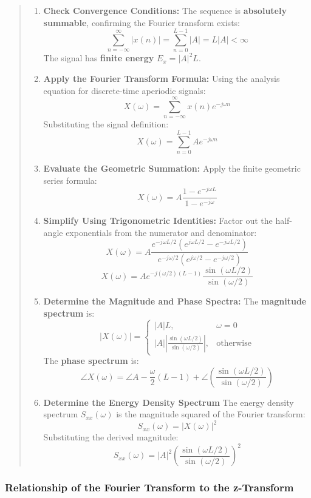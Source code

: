 \begin{quote}
\begin{enumerate}
\def\labelenumi{\arabic{enumi}.}
\item
  \textbf{Check Convergence Conditions:} The sequence is
  \textbf{absolutely summable}, confirming the Fourier transform exists:
  \[\sum_{n=-\infty}^{\infty} |x(n)| = \sum_{n=0}^{L-1} |A| = L|A| < \infty\]
  The signal has \textbf{finite energy} \(E_x = |A|^2L\).
\item
  \textbf{Apply the Fourier Transform Formula:} Using the analysis
  equation for discrete-time aperiodic signals:
  \[X(\omega) = \sum_{n=-\infty}^{\infty} x(n)e^{-j\omega n}\]
  Substituting the signal definition:
  \[X(\omega) = \sum_{n=0}^{L-1} Ae^{-j\omega n}\]
\item
  \textbf{Evaluate the Geometric Summation:} Apply the finite geometric
  series formula:
  \[X(\omega) = A \frac{1- e^{-j\omega L}}{1- e^{-j\omega}}\]
\item
  \textbf{Simplify Using Trigonometric Identities:} Factor out the
  half-angle exponentials from the numerator and denominator:
  \[X(\omega) = A \frac{e^{-j\omega L/2} (e^{j\omega L/2} - e^{-j\omega L/2})}{e^{-j\omega/2} (e^{j\omega/2} - e^{-j\omega/2})}\]
  \[X(\omega) = Ae^{-j(\omega/2)(L-1)} \frac{\sin(\omega L/2)}{\sin(\omega/2)}\]
\item
  \textbf{Determine the Magnitude and Phase Spectra:} The
  \textbf{magnitude spectrum} is:
  \[|X(\omega)| = \begin{cases} |A|L, & \omega = 0 \\ |A| \left| \frac{\sin(\omega L/2)}{\sin(\omega/2)} \right|, & \text{otherwise} \end{cases}\]
  The \textbf{phase spectrum} is:
  \[\angle X(\omega) = \angle A - \frac{\omega}{2}(L-1) + \angle \left( \frac{\sin(\omega L/2)}{\sin(\omega/2)} \right)\]
\item
  \textbf{Determine the Energy Density Spectrum} The energy density
  spectrum \(S_{xx}(\omega)\) is the magnitude squared of the Fourier
  transform: \[S_{xx}(\omega) = |X(\omega)|^2\] Substituting the derived
  magnitude:
  \[S_{xx}(\omega) = |A|^2 \left( \frac{\sin(\omega L/2)}{\sin(\omega/2)} \right)^2\]
\end{enumerate}
\end{quote}

\hypertarget{relationship-of-the-fourier-transform-to-the-z-transform}{%
\subsubsection{Relationship of the Fourier Transform to the
z-Transform}\label{relationship-of-the-fourier-transform-to-the-z-transform}}

